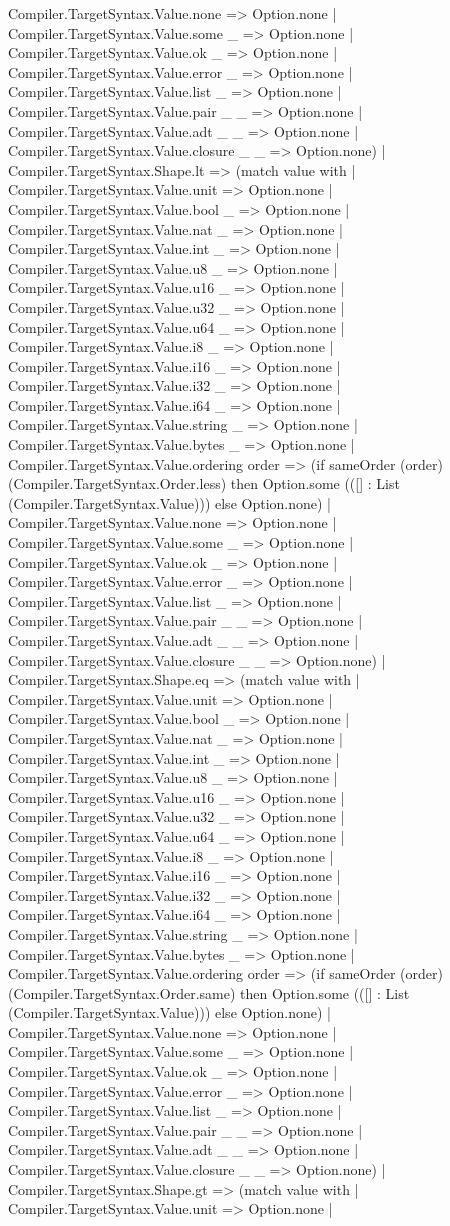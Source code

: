 \documentclass[11pt]{article}
\begin{document}
Compiler.TargetSyntax.Value.none => Option.none | Compiler.TargetSyntax.Value.some \_ => Option.none | Compiler.TargetSyntax.Value.ok \_ => Option.none | Compiler.TargetSyntax.Value.error \_ => Option.none | Compiler.TargetSyntax.Value.list \_ => Option.none | Compiler.TargetSyntax.Value.pair \_ \_ => Option.none | Compiler.TargetSyntax.Value.adt \_ \_ => Option.none | Compiler.TargetSyntax.Value.closure \_ \_ => Option.none) | Compiler.TargetSyntax.Shape.lt => (match value with | Compiler.TargetSyntax.Value.unit => Option.none | Compiler.TargetSyntax.Value.bool \_ => Option.none | Compiler.TargetSyntax.Value.nat \_ => Option.none | Compiler.TargetSyntax.Value.int \_ => Option.none | Compiler.TargetSyntax.Value.u8 \_ => Option.none | Compiler.TargetSyntax.Value.u16 \_ => Option.none | Compiler.TargetSyntax.Value.u32 \_ => Option.none | Compiler.TargetSyntax.Value.u64 \_ => Option.none | Compiler.TargetSyntax.Value.i8 \_ => Option.none | Compiler.TargetSyntax.Value.i16 \_ => Option.none | Compiler.TargetSyntax.Value.i32 \_ => Option.none | Compiler.TargetSyntax.Value.i64 \_ => Option.none | Compiler.TargetSyntax.Value.string \_ => Option.none | Compiler.TargetSyntax.Value.bytes \_ => Option.none | Compiler.TargetSyntax.Value.ordering order => (if sameOrder (order) (Compiler.TargetSyntax.Order.less) then Option.some (([] : List (Compiler.TargetSyntax.Value))) else Option.none) | Compiler.TargetSyntax.Value.none => Option.none | Compiler.TargetSyntax.Value.some \_ => Option.none | Compiler.TargetSyntax.Value.ok \_ => Option.none | Compiler.TargetSyntax.Value.error \_ => Option.none | Compiler.TargetSyntax.Value.list \_ => Option.none | Compiler.TargetSyntax.Value.pair \_ \_ => Option.none | Compiler.TargetSyntax.Value.adt \_ \_ => Option.none | Compiler.TargetSyntax.Value.closure \_ \_ => Option.none) | Compiler.TargetSyntax.Shape.eq => (match value with | Compiler.TargetSyntax.Value.unit => Option.none | Compiler.TargetSyntax.Value.bool \_ => Option.none | Compiler.TargetSyntax.Value.nat \_ => Option.none | Compiler.TargetSyntax.Value.int \_ => Option.none | Compiler.TargetSyntax.Value.u8 \_ => Option.none | Compiler.TargetSyntax.Value.u16 \_ => Option.none | Compiler.TargetSyntax.Value.u32 \_ => Option.none | Compiler.TargetSyntax.Value.u64 \_ => Option.none | Compiler.TargetSyntax.Value.i8 \_ => Option.none | Compiler.TargetSyntax.Value.i16 \_ => Option.none | Compiler.TargetSyntax.Value.i32 \_ => Option.none | Compiler.TargetSyntax.Value.i64 \_ => Option.none | Compiler.TargetSyntax.Value.string \_ => Option.none | Compiler.TargetSyntax.Value.bytes \_ => Option.none | Compiler.TargetSyntax.Value.ordering order => (if sameOrder (order) (Compiler.TargetSyntax.Order.same) then Option.some (([] : List (Compiler.TargetSyntax.Value))) else Option.none) | Compiler.TargetSyntax.Value.none => Option.none | Compiler.TargetSyntax.Value.some \_ => Option.none | Compiler.TargetSyntax.Value.ok \_ => Option.none | Compiler.TargetSyntax.Value.error \_ => Option.none | Compiler.TargetSyntax.Value.list \_ => Option.none | Compiler.TargetSyntax.Value.pair \_ \_ => Option.none | Compiler.TargetSyntax.Value.adt \_ \_ => Option.none | Compiler.TargetSyntax.Value.closure \_ \_ => Option.none) | Compiler.TargetSyntax.Shape.gt => (match value with | Compiler.TargetSyntax.Value.unit => Option.none | 
\end{document}
